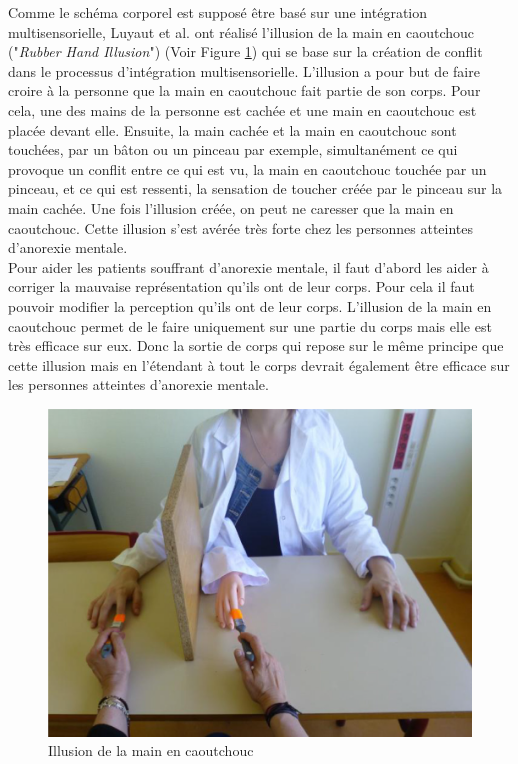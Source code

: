  Comme le schéma corporel est supposé être basé sur une intégration multisensorielle, Luyaut et al. \cite{lu14} ont réalisé l'illusion de la main en caoutchouc ("\emph{Rubber Hand Illusion}") \cite{Bo98} (Voir Figure \ref{fig1}) qui se base sur la création de conflit dans le processus d'intégration multisensorielle. L'illusion a pour but de faire croire à la personne que la main en caoutchouc fait partie de son corps. Pour cela, une des mains de la personne est cachée et une main en caoutchouc est placée devant elle. Ensuite, la main cachée et la main en caoutchouc sont touchées, par un bâton ou un pinceau par exemple, simultanément ce qui provoque un conflit entre ce qui est vu, la main en caoutchouc touchée par un pinceau, et ce qui est ressenti, la sensation de toucher créée par le pinceau sur la main cachée. Une fois l'illusion créée, on peut ne caresser que la main en caoutchouc. Cette illusion s'est avérée très forte chez les personnes atteintes d'anorexie mentale.\\

Pour aider les patients souffrant d'anorexie mentale, il faut d'abord les aider à corriger la mauvaise représentation qu'ils ont de leur corps. Pour cela il faut pouvoir modifier la perception qu'ils ont de leur corps. L'illusion de la main en caoutchouc permet de le faire uniquement sur une partie du corps mais elle est très efficace sur eux. Donc la sortie de corps qui repose sur le même principe que cette illusion mais en l'étendant à tout le corps devrait également être efficace sur les personnes atteintes d'anorexie mentale.
\begin{figure}[h]
   	\centerline{\includegraphics[scale=0.30]{./rubberhand}}
   	\caption{\label{fig1} Illusion de la main en caoutchouc \cite{lu14}}
\end{figure}


